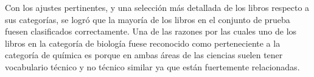 Con los ajustes pertinentes, y una selección más detallada de los libros respecto a sus categorías, se logró que la mayoría de los libros en el conjunto de prueba fuesen clasificados correctamente. Una de las razones por las cuales uno de los libros en la categoría de biología fuese reconocido como perteneciente a la categoría de química es porque en ambas áreas de las ciencias suelen tener vocabulario técnico y no técnico similar ya que están fuertemente relacionadas.



\nocite{*} %


